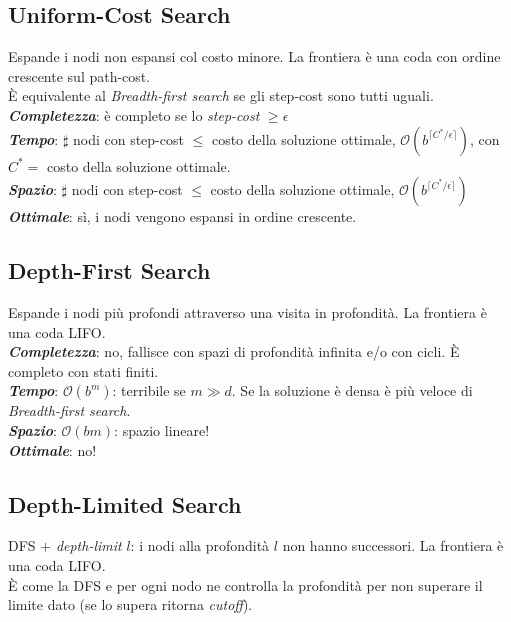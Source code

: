 \documentclass[a4paper, notitlepage, 9pt]{extreport}
\begin{document}
\subsection*{Uniform-Cost Search}
Espande i nodi non espansi col costo minore. La frontiera è una coda con ordine crescente sul path-cost.\\
È equivalente al \textit{Breadth-first search} se gli step-cost sono tutti uguali.\\
\textit{\textbf{Completezza}}: è completo se lo \textit{step-cost} $\geq \epsilon$\\
\textit{\textbf{Tempo}}: $\sharp$ nodi con step-cost $\leq$ costo della soluzione ottimale, $\mathcal{O}(b^{\lceil C^*/\epsilon\rceil})$, con $C^* =$ costo della soluzione ottimale.\\
\textit{\textbf{Spazio}}: $\sharp$ nodi con step-cost $\leq$ costo della soluzione ottimale, $\mathcal{O}(b^{\lceil C^*/\epsilon\rceil})$\\
\textit{\textbf{Ottimale}}: sì, i nodi vengono espansi in ordine crescente.

\subsection*{Depth-First Search}
Espande i nodi più profondi attraverso una visita in profondità. La frontiera è una coda LIFO.\\
\textit{\textbf{Completezza}}: no, fallisce con spazi di profondità infinita e/o con cicli. È completo con stati finiti.\\
\textit{\textbf{Tempo}}: $\mathcal{O}(b^m)$: terribile se $m \gg d$. Se la soluzione è densa è più veloce di \textit{Breadth-first search}.\\
\textit{\textbf{Spazio}}: $\mathcal{O}(bm)$: spazio lineare!\\
\textit{\textbf{Ottimale}}: no!

\subsection*{Depth-Limited Search}
DFS $+$ \textit{depth-limit} $l$: i nodi alla profondità $l$ non hanno successori. La frontiera è una coda LIFO.\\
È come la DFS e per ogni nodo ne controlla la profondità per non superare il limite dato (se lo supera ritorna \textit{cutoff}).
\end{document}
